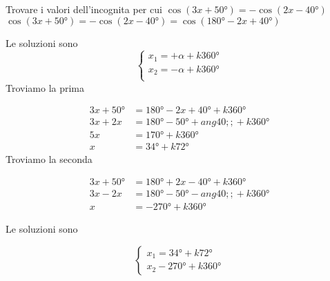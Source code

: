 \begin{exercise}
	Trovare i valori dell'incognita per cui $\cos(3x+\ang{50;;})=-\cos(2x-\ang{40;;})$
	\tcblower
$\cos(3x+\ang{50;;})=-\cos(2x-\ang{40;;})=\cos(\ang{180;;}-2x+\ang{40;;})$
	
	Le soluzioni sono 
	\[\begin{cases}
	x_1=+\alpha+k\ang{360;;}\\
	x_2=-\alpha+k\ang{360;;}\\
	\end{cases}\]
	Troviamo la prima
	
	\begin{align*}
	3x+\ang{50;;}&=\ang{180;;}-2x+\ang{40;;}+k\ang{360;;}\\
	3x+2x&=\ang{180;;}-\ang{50;;}+ang{40;;}+k\ang{360;;}\\
	5x&=\ang{170;;}+k\ang{360;;}\\
	x&=\ang{34;;}+k\ang{72;;}
	\end{align*}
	Troviamo la seconda
	
	\begin{align*}
		3x+\ang{50;;}&=\ang{180;;}+2x-\ang{40;;}+k\ang{360;;}\\
		3x-2x&=\ang{180;;}-\ang{50;;}-ang{40;;}+k\ang{360;;}\\
		x&=-\ang{270;;}+k\ang{360;;}
	\end{align*}
	
	Le soluzioni sono
	
	\[\begin{cases}
	x_1=\ang{34;;}+k\ang{72;;}\\
	x_2-\ang{270;;}+k\ang{360;;}
	\end{cases}\]
\end{exercise}

